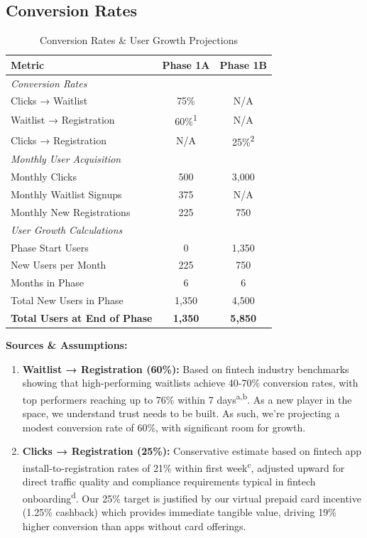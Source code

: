 \documentclass[11pt,letterpaper]{article}
\begin{document}
\subsection{Conversion Rates}

\begin{table}[htbp]
\centering
\caption{Conversion Rates \& User Growth Projections}
\begin{tabular}{|l|c|c|}
\hline
\textbf{Metric} & \textbf{Phase 1A} & \textbf{Phase 1B} \\
\hline
\multicolumn{3}{|l|}{\textit{Conversion Rates}} \\
\hline
Clicks → Waitlist & 75\% & N/A \\
Waitlist → Registration & 60\%\textsuperscript{1} & N/A \\
Clicks → Registration & N/A & 25\%\textsuperscript{2} \\
\hline
\multicolumn{3}{|l|}{\textit{Monthly User Acquisition}} \\
\hline
Monthly Clicks & 500 & 3,000 \\
Monthly Waitlist Signups & 375 & N/A \\
Monthly New Registrations & 225 & 750 \\
\hline
\multicolumn{3}{|l|}{\textit{User Growth Calculations}} \\
\hline
Phase Start Users & 0 & 1,350 \\
New Users per Month & 225 & 750 \\
Months in Phase & 6 & 6 \\
Total New Users in Phase & 1,350 & 4,500 \\
\textbf{Total Users at End of Phase} & \textbf{1,350} & \textbf{5,850} \\
\hline
\end{tabular}
\end{table}

\vspace{0.5em}

\textbf{Sources \& Assumptions:}
\begin{enumerate}
\item \textbf{Waitlist → Registration (60\%):} Based on fintech industry benchmarks showing that high-performing waitlists achieve 40-70\% conversion rates, with top performers reaching up to 76\% within 7 days\textsuperscript{a,b}. As a new player in the space, we understand trust needs to be built. As such, we're projecting a modest conversion rate of 60\%, with significant room for growth.
\item \textbf{Clicks → Registration (25\%):} Conservative estimate based on fintech app install-to-registration rates of 21\% within first week\textsuperscript{c}, adjusted upward for direct traffic quality and compliance requirements typical in fintech onboarding\textsuperscript{d}. Our 25\% target is justified by our virtual prepaid card incentive (1.25\% cashback) which provides immediate tangible value, driving 19\% higher conversion than apps without card offerings.
\end{enumerate}
\end{document}
